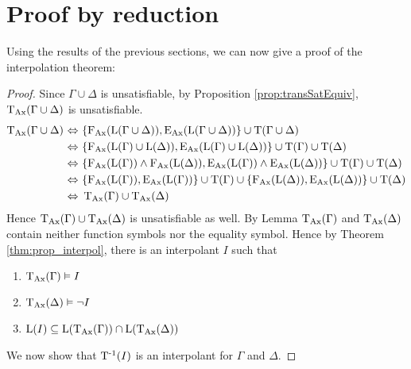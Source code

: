 		\section{Proof by reduction}

		Using the results of the previous sections, we can now give a proof of the interpolation theorem:

		\interpolationRevThm*
		\begin{proof}%

			Since $\Gamma \cup \Delta$ is unsatisfiable,
			by Proposition \ref{prop:transSatEquiv}, $\TransAll(\Gamma \cup \Delta)$ is unsatisfiable.
			\begin{align*}
				\TransAll(\Gamma \cup \Delta)\,\semiff~&\{\FAX(\Lang(\Gamma\cup\Delta)), \EAX(\Lang(\Gamma \cup\Delta))\} \cup \Trans(\Gamma \cup \Delta) \\
				\semiff~&\{\FAX(\Lang(\Gamma)\cup\Lang(\Delta)), \EAX(\Lang(\Gamma)\cup\Lang(\Delta))\} \cup \Trans(\Gamma )\cup \Trans(\Delta) \\
				\semiff~&\{\FAX(\Lang(\Gamma)) \land \FAX(\Lang(\Delta)), \EAX(\Lang(\Gamma)) \land \EAX(\Lang(\Delta))\} \cup \Trans(\Gamma) \cup \Trans(\Delta) \\
				\semiff~&\{\FAX(\Lang(\Gamma)),\EAX(\Lang(\Gamma))\} \cup \Trans(\Gamma) \cup \{\FAX(\Lang(\Delta)), \EAX(\Lang(\Delta))\} \cup \Trans(\Delta) \\
				\semiff~&\TransAll(\Gamma) \cup \TransAll(\Delta)
			\end{align*}
			Hence  $\TransAll(\Gamma) \cup \TransAll(\Delta)$ is unsatisfiable as well.
			By Lemma  $\TransAll(\Gamma)$ and $\TransAll(\Delta)$ contain neither function symbols nor the equality symbol.
			Hence by Theorem \ref{thm:prop_interpol}, there is an interpolant $I$ such that
			\begin{enumerate}
				\item $\TransAll(\Gamma) \entails I$
				\item $\TransAll(\Delta) \entails \lnot I$ 
				\item $\Lang(I) \subseteq \Lang(\TransAll(\Gamma)) \cap \Lang(\TransAll(\Delta))$
					\label{proof:interpolation1_3}
			\end{enumerate}

			We now show that $\TransInv(I)$ is an interpolant for $\Gamma$ and $\Delta$.


\end{proof}
